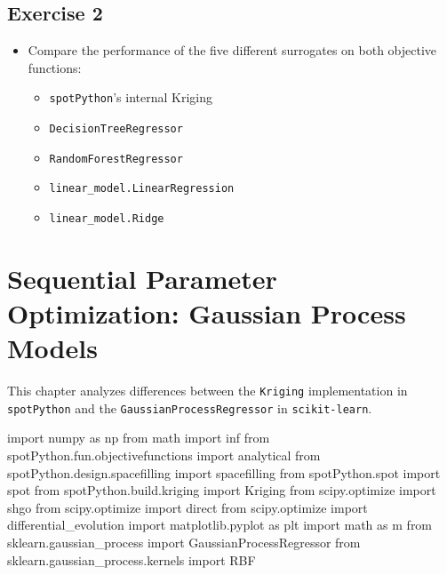 \documentclass[
  letterpaper,
  DIV=11,
  numbers=noendperiod]{scrreprt}
\newenvironment{Shaded}{\begin{snugshade}}{\end{snugshade}}
\newcommand{\ImportTok}[1]{\textcolor[rgb]{0.00,0.46,0.62}{#1}}
\newcommand{\NormalTok}[1]{\textcolor[rgb]{0.00,0.23,0.31}{#1}}
\providecommand{\tightlist}{%
  \setlength{\itemsep}{0pt}\setlength{\parskip}{0pt}}\usepackage{longtable,booktabs,array}
\begin{document}
\hypertarget{exercise-2}{%
\section{Exercise 2}\label{exercise-2}}

\begin{itemize}
\item
  Compare the performance of the five different surrogates on both
  objective functions:

  \begin{itemize}
  \tightlist
  \item
    \texttt{spotPython}'s internal Kriging
  \item
    \texttt{DecisionTreeRegressor}
  \item
    \texttt{RandomForestRegressor}
  \item
    \texttt{linear\_model.LinearRegression}
  \item
    \texttt{linear\_model.Ridge}
  \end{itemize}
\end{itemize}

\hypertarget{sec-gaussian-process-models}{%
\chapter{Sequential Parameter Optimization: Gaussian Process
Models}\label{sec-gaussian-process-models}}

This chapter analyzes differences between the \texttt{Kriging}
implementation in \texttt{spotPython} and the
\texttt{GaussianProcessRegressor} in \texttt{scikit-learn}.

\begin{Shaded}
\begin{Highlighting}[]
\ImportTok{import}\NormalTok{ numpy }\ImportTok{as}\NormalTok{ np}
\ImportTok{from}\NormalTok{ math }\ImportTok{import}\NormalTok{ inf}
\ImportTok{from}\NormalTok{ spotPython.fun.objectivefunctions }\ImportTok{import}\NormalTok{ analytical}
\ImportTok{from}\NormalTok{ spotPython.design.spacefilling }\ImportTok{import}\NormalTok{ spacefilling}
\ImportTok{from}\NormalTok{ spotPython.spot }\ImportTok{import}\NormalTok{ spot}
\ImportTok{from}\NormalTok{ spotPython.build.kriging }\ImportTok{import}\NormalTok{ Kriging}
\ImportTok{from}\NormalTok{ scipy.optimize }\ImportTok{import}\NormalTok{ shgo}
\ImportTok{from}\NormalTok{ scipy.optimize }\ImportTok{import}\NormalTok{ direct}
\ImportTok{from}\NormalTok{ scipy.optimize }\ImportTok{import}\NormalTok{ differential\_evolution}
\ImportTok{import}\NormalTok{ matplotlib.pyplot }\ImportTok{as}\NormalTok{ plt}
\ImportTok{import}\NormalTok{ math }\ImportTok{as}\NormalTok{ m}
\ImportTok{from}\NormalTok{ sklearn.gaussian\_process }\ImportTok{import}\NormalTok{ GaussianProcessRegressor}
\ImportTok{from}\NormalTok{ sklearn.gaussian\_process.kernels }\ImportTok{import}\NormalTok{ RBF}
\end{Highlighting}
\end{Shaded}
\end{document}
